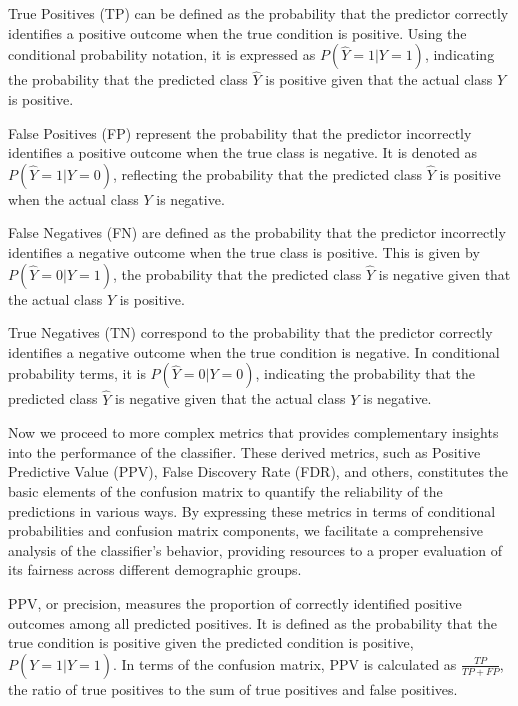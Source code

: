 True Positives (TP) can be defined as the probability that the predictor correctly identifies a positive outcome when the true condition is positive. Using the conditional probability notation, it is expressed as $P(\hat{Y}=1|Y=1)$, indicating the probability that the predicted class $\hat{Y}$ is positive given that the actual class $Y$ is positive.

False Positives (FP) represent the probability that the predictor incorrectly identifies a positive outcome when the true class is negative. It is denoted as $P(\hat{Y}=1|Y=0)$, reflecting the probability that the predicted class $\hat{Y}$ is positive when the actual class $Y$ is negative.

False Negatives (FN) are defined as the probability that the predictor incorrectly identifies a negative outcome when the true class is positive. This is given by $P(\hat{Y}=0|Y=1)$, the probability that the predicted class $\hat{Y}$ is negative given that the actual class $Y$ is positive.

True Negatives (TN) correspond to the probability that the predictor correctly identifies a negative outcome when the true condition is negative. In conditional probability terms, it is $P(\hat{Y}=0|Y=0)$, indicating the probability that the predicted class $\hat{Y}$ is negative given that the actual class $Y$ is negative.

Now we proceed to more complex metrics that provides complementary insights into the performance of the classifier. These derived metrics, such as Positive Predictive Value (PPV), False Discovery Rate (FDR), and others, constitutes the basic elements of the confusion matrix to quantify the reliability of the predictions in various ways. By expressing these metrics in terms of conditional probabilities and confusion matrix components, we facilitate a comprehensive analysis of the classifier's behavior, providing resources to a proper evaluation of its fairness across different demographic groups.

\begin{definition}\label{def:ppv}
PPV, or precision, measures the proportion of correctly identified positive outcomes among all predicted positives. It is defined as the probability that the true condition is positive given the predicted condition is positive, $P(Y=1|\hat{Y}=1)$. In terms of the confusion matrix, PPV is calculated as $\frac{TP}{TP + FP}$, the ratio of true positives to the sum of true positives and false positives.
\end{definition}

